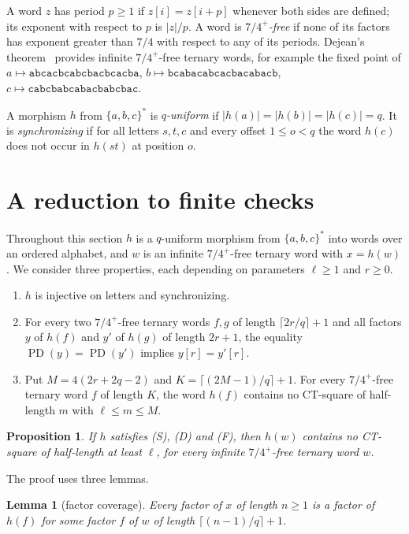 \documentclass[11pt]{amsart}
\newtheorem{lemma}[theorem]{Lemma}
\newtheorem{proposition}[theorem]{Proposition}
\theoremstyle{definition}
\theoremstyle{remark}
\newcommand{\PD}{\operatorname{PD}}
\newcommand{\tw}{\mathtt}
\begin{document}
A word $z$ has period $p\ge1$ if $z[i]=z[i+p]$ whenever both sides are defined; its exponent with respect to $p$ is $|z|/p$. A word is \emph{$7/4^+$-free} if none of its factors has exponent greater than $7/4$ with respect to any of its periods. Dejean's theorem~\cite{Dejean1972} provides infinite $7/4^+$-free ternary words, for example the fixed point of $a\mapsto\tw{abcacbcabcbacbcacba}$, $b\mapsto\tw{bcabacabcacbacabacb}$, $c\mapsto\tw{cabcbabcabacbabcbac}$.

A morphism $h$ from $\{a,b,c\}^*$ is \emph{$q$-uniform} if $|h(a)|=|h(b)|=|h(c)|=q$. It is \emph{synchronizing} if for all letters $s,t,c$ and every offset $1\le o<q$ the word $h(c)$ does not occur in $h(st)$ at position $o$.

\section{A reduction to finite checks}\label{sec:reduction}

Throughout this section $h$ is a $q$-uniform morphism from $\{a,b,c\}^*$ into words over an ordered alphabet, and $w$ is an infinite $7/4^+$-free ternary word with $x=h(w)$. We consider three properties, each depending on parameters $\ell\ge1$ and $r\ge0$.
\begin{enumerate}
\item[(S)] $h$ is injective on letters and synchronizing.
\item[(D)] For every two $7/4^+$-free ternary words $f,g$ of length $\lceil 2r/q\rceil+1$ and all factors $y$ of $h(f)$ and $y'$ of $h(g)$ of length $2r+1$, the equality $\PD(y)=\PD(y')$ implies $y[r]=y'[r]$.
\item[(F)] Put $M=4(2r+2q-2)$ and $K=\lceil(2M-1)/q\rceil+1$. For every $7/4^+$-free ternary word $f$ of length $K$, the word $h(f)$ contains no CT-square of half-length $m$ with $\ell\le m\le M$.
\end{enumerate}

\begin{proposition}\label{prop:reduction}
If $h$ satisfies (S), (D) and (F), then $h(w)$ contains no CT-square of half-length at least $\ell$, for every infinite $7/4^+$-free ternary word $w$.
\end{proposition}

The proof uses three lemmas.

\begin{lemma}[factor coverage]\label{lem:coverage}
Every factor of $x$ of length $n\ge1$ is a factor of $h(f)$ for some factor $f$ of $w$ of length $\lceil(n-1)/q\rceil+1$.
\end{lemma}
\end{document}
